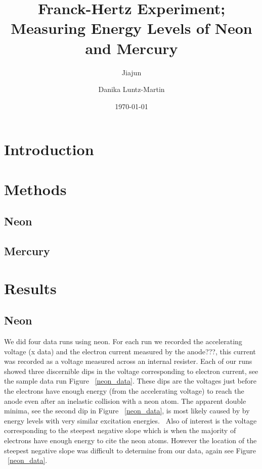 \documentclass[prb,preprint]{revtex4-1}
\begin{document}
\title{Franck-Hertz Experiment; Measuring Energy Levels of Neon and Mercury}

\author{Jiajun}


\author{Danika Luntz-Martin}


\date{\today}

\begin{abstract}


\end{abstract}


\maketitle 


\section{Introduction} 


\section{Methods}

\subsection{Neon}
\subsection{Mercury}


\section{Results}

\subsection{Neon}

We did four data runs using neon. For each run we recorded the accelerating voltage (x data) and the electron current measured by the anode???, this current was recorded as a voltage measured across an internal resister. Each of our runs showed three discernible dips in the voltage corresponding to electron current, see the sample data run Figure ~\ref{neon_data}. These dips are the voltages just before the electrons have enough energy (from the accelerating voltage) to reach the anode even after an inelastic collision with a neon atom. The apparent double minima, see the second dip in Figure ~\ref{neon_data}, is most likely caused by by energy levels with very similar excitation energies.~\cite{XXX} Also of interest is the voltage corresponding to the steepest negative slope which is when the majority of electrons have enough energy to cite the neon atoms. However the location of the steepest negative slope was difficult to determine from our data, again see Figure ~\ref{neon_data}.
\end{document}
